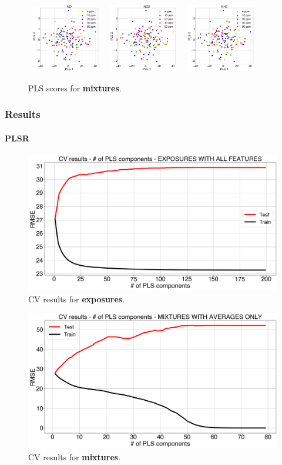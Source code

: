\documentclass{beamer}
\begin{document}
\begin{frame}
		\begin{figure}
			\includegraphics[width=0.30\textwidth, height = 3cm, keepaspectratio]{../../figures/plsNO-avg-feat.png}
			\hfill
			\includegraphics[width=0.30\textwidth, height = 3cm, keepaspectratio]{../../figures/plsNO2-avg-feat.png}
			\hfill
			\includegraphics[width=0.30\textwidth, height = 3cm, keepaspectratio]{../../figures/plsNH3-avg-feat.png}
			\caption{PLS scores for \textbf{mixtures}.}
			\label{fig:pls-avg-only}
		\end{figure}
	
\end{frame}

\begin{frame}
	\frametitle{Results}
	\framesubtitle{PLSR}
		\begin{figure}
			\includegraphics[width=0.5\linewidth]{../../figures/pls-cv.png}
			\caption{CV results for \textbf{exposures}.}
			\label{fig:pls-cv} 
		\end{figure}
		
		\begin{figure}
			\includegraphics[width=0.5\linewidth]{../../figures/pls-cv-avg-feat.png}
			\caption{CV results for \textbf{mixtures}.}
			\label{fig:pls-cv-avg-feat}
		\end{figure}
\end{frame}
\end{document}
